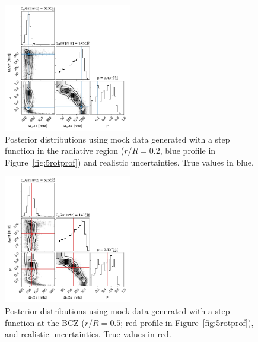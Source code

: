 \begin{figure}
\centering
    \includegraphics[width=0.5\textwidth]{Figures/subgiant_chapter_figures/10.2_corner.png}
    \caption{Posterior distributions using mock data generated with a step function in the radiative region ($r/R = 0.2$, blue profile in Figure~\ref{fig:5rotprof}) and realistic uncertainties. True values in blue.}
    \label{fig:mock_posterior_020_uniform}
\end{figure}
\begin{figure}
\centering
    \includegraphics[width=0.5\textwidth]{Figures/subgiant_chapter_figures/10.5_corner.png}
    \caption{Posterior distributions using mock data generated with a step function at the BCZ ($r/R = 0.5$; red profile in Figure~\ref{fig:5rotprof}), and realistic uncertainties. True values in red.}
    \label{fig:mock_posterior_050_uniform}
\end{figure}

